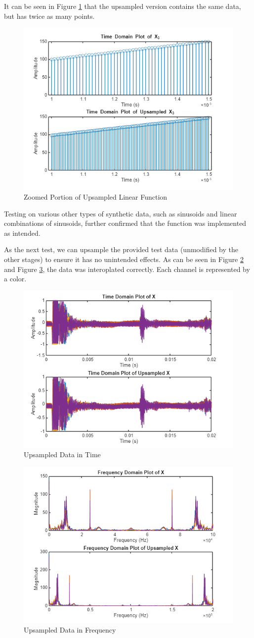 It can be seen  in Figure \ref{fig:linear_upsample_zoom} that the upsampled version contains the same data, but has twice as many points.

\begin{figure}[H]
    \centering
    \includegraphics[width=0.5\linewidth]{figures/linear_upsample_zoom.png}
    \caption{Zoomed Portion of Upsampled Linear Function}
    \label{fig:linear_upsample_zoom}
\end{figure}

Testing on various other types of synthetic data, such as sinusoids and linear combinations of sinusoids, further confirmed that the function was implemented as intended.  

As the next test, we can upsample the provided test data (unmodified by the other stages) to ensure it has no unintended effects.  As can be seen in Figure \ref{fig:upsample_time} and Figure \ref{fig:upsample_freq}, the data was interoplated correctly.  Each channel is represented by a color.

\begin{figure}[H]
    \centering
    \includegraphics[width=0.5\linewidth]{figures/upsample_time.png}
    \caption{Upsampled Data in Time}
    \label{fig:upsample_time}
\end{figure}

\begin{figure}[H]
    \centering
    \includegraphics[width=0.5\linewidth]{figures/upsample_freq.png}
    \caption{Upsampled Data in Frequency}
    \label{fig:upsample_freq}
\end{figure}

